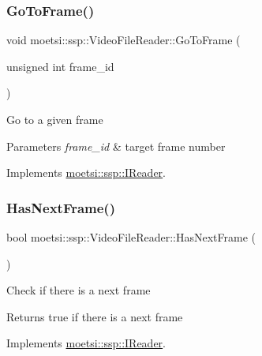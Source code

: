 \subsubsection{\texorpdfstring{Go\+To\+Frame()}{GoToFrame()}}
{\footnotesize\ttfamily void moetsi\+::ssp\+::\+Video\+File\+Reader\+::\+Go\+To\+Frame (\begin{DoxyParamCaption}\item[{unsigned int}]{frame\+\_\+id }\end{DoxyParamCaption})\hspace{0.3cm}{\ttfamily [virtual]}}

Go to a given frame 
\begin{DoxyParams}{Parameters}
{\em frame\+\_\+id} & target frame number \\
\hline
\end{DoxyParams}


Implements \hyperlink{classmoetsi_1_1ssp_1_1IReader_a6f1be3c06538992cca6d550bd9566681}{moetsi\+::ssp\+::\+I\+Reader}.

\mbox{\label{classmoetsi_1_1ssp_1_1VideoFileReader_ab5733b56b6d6dd7596eac9d914481c7e}} 
\subsubsection{\texorpdfstring{Has\+Next\+Frame()}{HasNextFrame()}}
{\footnotesize\ttfamily bool moetsi\+::ssp\+::\+Video\+File\+Reader\+::\+Has\+Next\+Frame (\begin{DoxyParamCaption}{ }\end{DoxyParamCaption})\hspace{0.3cm}{\ttfamily [virtual]}}

Check if there is a next frame \begin{DoxyReturn}{Returns}
true if there is a next frame 
\end{DoxyReturn}


Implements \hyperlink{classmoetsi_1_1ssp_1_1IReader_af9186ba41e136dc4ec3242b5dd55fa04}{moetsi\+::ssp\+::\+I\+Reader}.

\mbox{\label{classmoetsi_1_1ssp_1_1VideoFileReader_afdaf5606fd0cfcc2e1b5b7c0fb271ebf}} 

